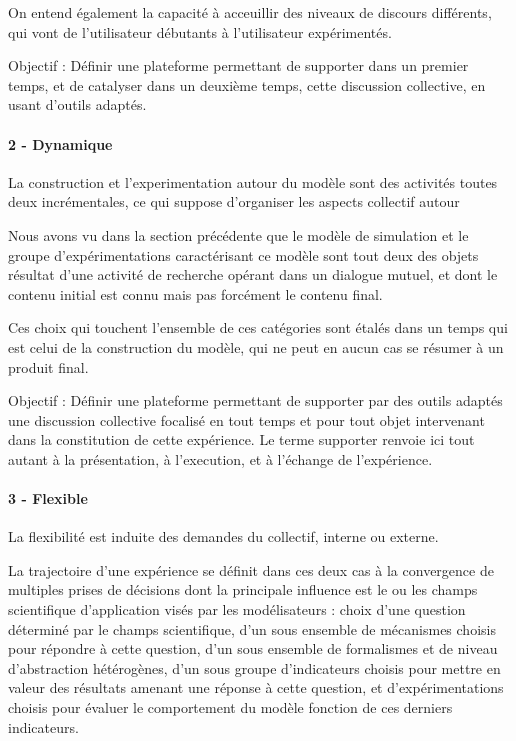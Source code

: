 On entend également la capacité à acceuillir des niveaux de discours différents, qui vont de l'utilisateur débutants à l'utilisateur expérimentés.

Objectif : Définir une plateforme permettant de supporter dans un premier temps, et de catalyser dans un deuxième temps, cette discussion collective, en usant d'outils adaptés. 


\paragraph{2 - Dynamique}

La construction et l'experimentation autour du modèle sont des activités toutes deux incrémentales, ce qui suppose d'organiser les aspects collectif autour 

Nous avons vu dans la section précédente que le modèle de simulation et le groupe d'expérimentations caractérisant ce modèle sont tout deux des objets résultat d'une activité de recherche opérant dans un dialogue mutuel, et dont le contenu initial est connu mais pas forcément le contenu final.


Ces choix qui touchent l'ensemble de ces catégories sont étalés dans un temps qui est celui de la construction du modèle, qui ne peut en aucun cas se résumer à un produit final. 

Objectif : Définir une plateforme permettant de supporter par des outils adaptés une discussion collective focalisé en tout temps et pour tout objet intervenant dans la constitution de cette expérience. Le terme supporter renvoie ici tout autant à la présentation, à l'execution, et à l'échange de l'expérience.

\paragraph{3 - Flexible}

La flexibilité est induite des demandes du collectif, interne ou externe.

La trajectoire d'une expérience se définit dans ces deux cas à la convergence de multiples prises de décisions dont la principale influence est le ou les champs scientifique d'application visés par les modélisateurs : choix d'une question déterminé par le champs scientifique, d'un sous ensemble de mécanismes choisis pour répondre à cette question, d'un sous ensemble de formalismes et de niveau d'abstraction hétérogènes, d'un sous groupe d'indicateurs choisis pour mettre en valeur des résultats amenant une réponse à cette question, et d'expérimentations choisis pour évaluer le comportement du modèle fonction de ces derniers indicateurs. 

